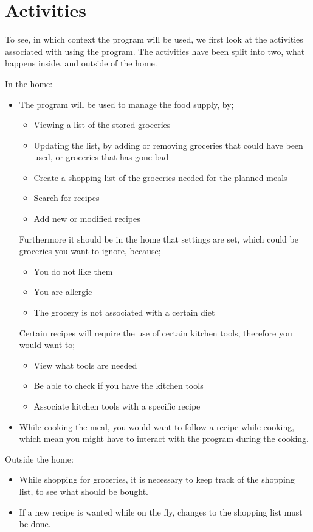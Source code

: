 \section{Activities}
To see, in which context the program will be used, we first look at the activities associated with using the program. The activities have been split into  two, what happens inside, and outside of the home.

In the home:
\begin{itemize}
\item The program will be used to manage the food supply, by;
	\begin{itemize}
		\item Viewing a list of the stored groceries
		\item Updating the list, by adding or removing groceries that could have been used, or groceries that has gone bad
		\item Create a shopping list of the groceries needed for the planned meals
		\item Search for recipes
		\item Add new or modified recipes
	\end{itemize}
	Furthermore it should be in the home that settings are set, which could be groceries you want to ignore, because;
	\begin{itemize}
		\item You do not like them
		\item You are allergic
		\item The grocery is not associated with a certain diet
	\end{itemize}
	Certain recipes will require the use of certain kitchen tools, therefore you would want to;
	\begin{itemize}
		\item View what tools are needed
		\item Be able to check if you have the kitchen tools
		\item Associate kitchen tools with a specific recipe
	\end{itemize}
	\item While cooking the meal, you would want to follow a recipe while cooking, which mean you might have to interact with the program during the cooking.
\end{itemize}

Outside the home:
\begin{itemize}
\item While shopping for groceries, it is necessary to keep track of the shopping list, to see what should be bought.
\item If a new recipe is wanted while on the fly, changes to the shopping list must be done.
\end{itemize}
